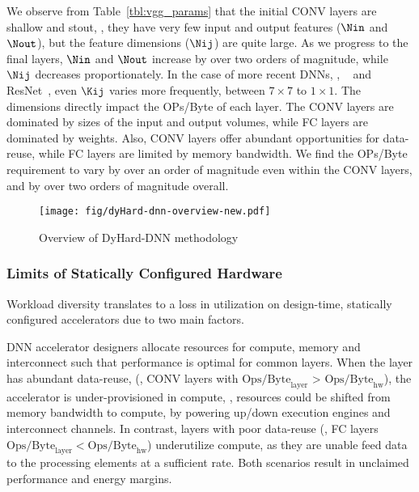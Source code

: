 We observe from Table~\ref{tbl:vgg_params} that the initial CONV layers are shallow and stout, \ie, they have very few input and output features ($\Nin$ and $\Nout$), but the feature dimensions ($\Nij$) are quite large.
As we progress to the final layers, $\Nin$ and $\Nout$ increase by over two orders of magnitude, while $\Nij$ decreases proportionately.
In the case of more recent DNNs, \eg, \googlenet~\cite{szegedy2015going} and ResNet~\cite{he2016deep}, even $\Kij$ varies more frequently, between $7\times7$ to $1\times1$.
The dimensions directly impact the OPs/Byte of each layer.
The CONV layers are dominated by sizes of the input and output volumes, while FC layers are dominated by weights.
Also, CONV layers offer abundant opportunities for data-reuse, while FC layers are limited by memory bandwidth.
We find the OPs/Byte requirement to vary by over an order of magnitude even within the CONV layers, and by over two orders of magnitude overall.

\begin{figure*}
    \centering
    \texttt{[image: fig/dyHard-dnn-overview-new.pdf]}
    \caption{Overview of DyHard-DNN methodology}
    \label{fig:overview}
\end{figure*}

\subsubsection{Limits of Statically Configured Hardware}

Workload diversity translates to a loss in utilization on design-time, statically configured accelerators due to two main factors.

DNN accelerator designers allocate resources for compute, memory and interconnect such that performance is optimal for common layers.
When the layer has abundant data-reuse, (\eg, CONV layers with $\textrm{Ops}/\textrm{Byte}_\textrm{layer}$ > $\textrm{Ops}/\textrm{Byte}_\textrm{hw}$), the accelerator is under-provisioned in compute, \ie, resources could be shifted from memory bandwidth to compute, by powering up/down execution engines and interconnect channels.
In contrast, layers with poor data-reuse (\eg, FC layers $\textrm{Ops}/\textrm{Byte}_\textrm{layer} < \textrm{Ops}/\textrm{Byte}_\textrm{hw}$) underutilize compute, as they are unable feed data to the processing elements at a sufficient rate.
Both scenarios result in unclaimed performance and energy margins.

